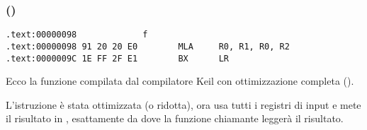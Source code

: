 \subsubsection{\OptimizingKeilVI (\ARMMode)}

\begin{lstlisting}[label=ARM_leaf_example1,style=customasmARM]
.text:00000098             f
.text:00000098 91 20 20 E0        MLA     R0, R1, R0, R2
.text:0000009C 1E FF 2F E1        BX      LR
\end{lstlisting}


Ecco la funzione \ttf compilata dal compilatore Keil con ottimizzazione completa (\Othree).

L'istruzione \MOV è stata ottimizzata (o ridotta), ora  usa tutti i registri di input e mete il risultato in , esattamente da dove
la funzione chiamante leggerà il risultato.
